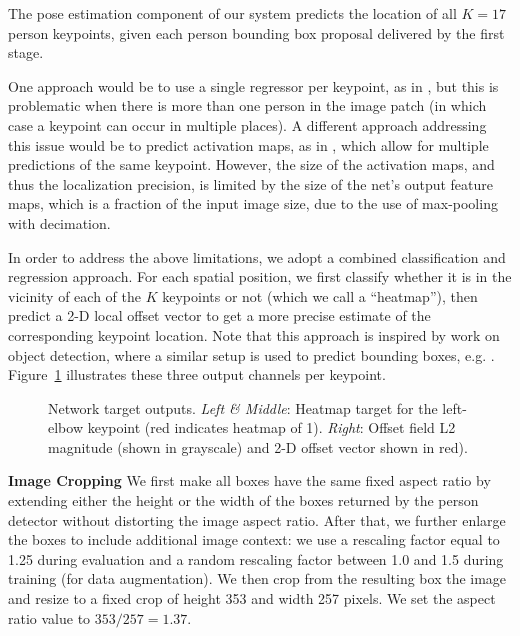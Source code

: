\documentclass[10pt,twocolumn,letterpaper]{article}
\begin{document}
The pose estimation component of our system predicts the location of all $K=17$ person keypoints, given each person bounding box proposal delivered by the first stage.

One approach would be to use a single regressor per keypoint, as in \cite{deeppose}, but this is problematic when there is more than one person in the image patch (in which case a keypoint can occur in multiple places). A different approach addressing this issue would be to predict activation maps, as in \cite{jainiclr2014}, which allow for multiple predictions of the same keypoint. However, the size of the activation maps, and thus the localization precision, is limited by the size of the net's output feature maps, which is a fraction of the input image size, due to the use of max-pooling with decimation.

In order to address the above limitations, we adopt a combined classification and regression approach. For each spatial position, we first classify whether it is in the vicinity of each of the $K$ keypoints or not (which we call a ``heatmap''), then predict a 2-D local offset vector to get a more precise estimate of the corresponding keypoint location. Note that this approach is inspired by work on object detection, where a similar setup is used to predict bounding boxes, e.g. \cite{erhan2014scalable, Ren2015}. Figure~\ref{fig:gt_heatmap_offset} illustrates these three output channels per keypoint.

\begin{figure}[h]
\centering
{}
\hfill
\caption{Network target outputs. \emph{Left \& Middle}: Heatmap target for the left-elbow keypoint (red indicates heatmap of 1). \emph{Right}: Offset field L2 magnitude (shown in grayscale) and 2-D offset vector shown in red).}
\label{fig:gt_heatmap_offset}
\end{figure}

\newcommand{\fcls}{f_{\mathrm{cls}}}
\newcommand{\floc}{f_{\mathrm{loc}}}

\textbf{Image Cropping}
We first make all boxes have the same fixed aspect ratio by extending either the height or the width of the boxes returned by the person detector without distorting the image aspect ratio. After that, we further enlarge the boxes to include additional image context: we use a rescaling factor equal to 1.25 during evaluation and a random rescaling factor between 1.0 and 1.5 during training (for data augmentation). We then crop from the resulting box the image and resize to a fixed crop of height 353 and width 257 pixels. We set the aspect ratio value to $353/257 = 1.37$.
\end{document}
